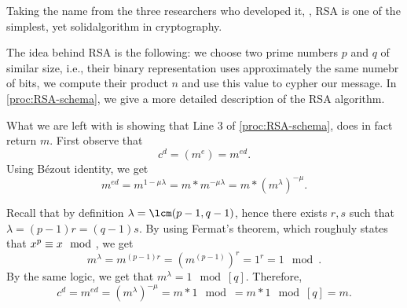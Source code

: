 \documentclass{subfiles}
\begin{document}
\label{sec:RSA}
    Taking the name from the three researchers who developed it, \citeauthor{RivestSA1977},
        RSA is one of the simplest, yet solid\footnotemark algorithm in cryptography.

    The idea behind RSA is the following: we choose two prime numbers \(p\) and \(q\)
        of similar size, i.e., their binary representation uses approximately the same numebr of bits,
        we compute their product \(n\) and use this value to cypher our message. 
        In \autoref{proc:RSA-schema}, we give a more detailed description of the RSA algorithm.

        


    What we are left with is showing that Line 3 of \autoref{proc:RSA-schema},
        does in fact return \(m\). First observe that 
        \[
            c^{d} = (m^{e}) = m^{ed}.
        \]
        Using Bézout identity, we get 
        \[
            m^{ed} = m^{1 - \mu\lambda} = m * m^{-\mu\lambda} = m * (m^{\lambda})^{-\mu}.
        \]
    
    Recall that by definition \(\lambda = \lcm(p - 1, q - 1)\),
        hence there exists \(r, s\) such that \(\lambda = (p -1)r = (q - 1)s\).
        By using Fermat's theorem, which roughuly states that \(x^{p} \equiv x \mod\),
        we get
        \[
            m^{\lambda} = m^{(p -1)r} = (m^{(p - 1)})^{r} = 1^{r} = 1 \mod.
        \]
        By the same logic, we get that \(m^{\lambda} = 1 \mod[q]\).
        Therefore,
        \[
            c^{d} = m^{ed} = (m^{\lambda})^{-\mu} = m * 1 \mod = m * 1 \mod[q] = m.
        \]
\end{document}
